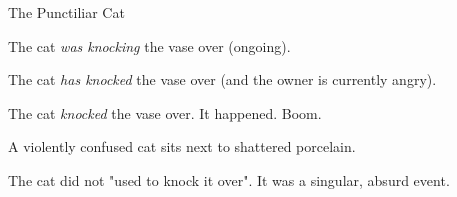 \documentclass[10pt, compress]{beamer}
\begin{document}
\begin{frame}{The Punctiliar Cat}
  
  
  \vspace{0.3cm}
  
  \begin{narrow_itemize}
    \item {} The cat \textit{was knocking} the vase over (ongoing).
    \item {} The cat \textit{has knocked} the vase over (and the owner is currently angry).
    \item {} The cat \textit{knocked} the vase over. It happened. Boom.
  \end{narrow_itemize}
  
  \vspace{0.5cm}
  
  
  \begin{narrow_itemize}
    \item A violently confused cat sits next to shattered porcelain.
    \item The cat did not "used to knock it over". It was a singular, absurd event.
  \end{narrow_itemize}

  \vspace{0.5cm}
  
   
  
  \vspace{1cm}
  
\end{frame}
\end{document}
